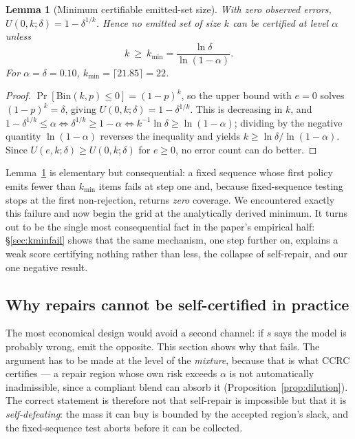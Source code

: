 \documentclass{article}
\theoremstyle{plain}
\newtheorem{lemma}{Lemma}
\theoremstyle{definition}
\theoremstyle{remark}
\begin{document}
\begin{lemma}[Minimum certifiable emitted-set size]
\label{lem:kmin}
With zero observed errors, $U(0,k;\delta)=1-\delta^{1/k}$. Hence no emitted set of size
$k$ can be certified at level $\alpha$ unless
\[
k\ \ge\ k_{\min}=\frac{\ln\delta}{\ln(1-\alpha)} .
\]
For $\alpha=\delta=0.10$, $k_{\min}=\lceil 21.85\rceil=22$.
\end{lemma}

\begin{proof}
$\Pr[\mathrm{Bin}(k,p)\le 0]=(1-p)^k$, so the upper bound with $e=0$ solves
$(1-p)^k=\delta$, giving $U(0,k;\delta)=1-\delta^{1/k}$. This is decreasing in $k$, and
$1-\delta^{1/k}\le\alpha\iff\delta^{1/k}\ge1-\alpha\iff k^{-1}\ln\delta\ge\ln(1-\alpha)$;
dividing by the negative quantity $\ln(1-\alpha)$ reverses the inequality and yields
$k\ge\ln\delta/\ln(1-\alpha)$. Since $U(e,k;\delta)\ge U(0,k;\delta)$ for $e\ge0$, no error
count can do better.
\end{proof}

Lemma~\ref{lem:kmin} is elementary but consequential: a fixed sequence whose first policy
emits fewer than $k_{\min}$ items fails at step one and, because fixed-sequence testing
stops at the first non-rejection, returns \emph{zero} coverage. We encountered exactly this
failure and now begin the grid at the analytically derived minimum. It turns out to be the
single most consequential fact in the paper's empirical half: \S\ref{sec:kminfail} shows that
the same mechanism, one step further on, explains a weak score certifying nothing rather than
less, the collapse of self-repair, and our one negative result.

\subsection{Why repairs cannot be self-certified in practice}
\label{sec:independence}

The most economical design would avoid a second channel: if $s$ says the model is probably
wrong, emit the opposite. This section shows why that fails. The argument has to be made at
the level of the \emph{mixture}, because that is what CCRC certifies --- a repair region
whose own risk exceeds $\alpha$ is not automatically inadmissible, since a compliant blend
can absorb it (Proposition~\ref{prop:dilution}). The correct statement is therefore not
that self-repair is impossible but that it is \emph{self-defeating}: the mass it can buy is
bounded by the accepted region's slack, and the fixed-sequence test aborts before it can be
collected.
\end{document}
